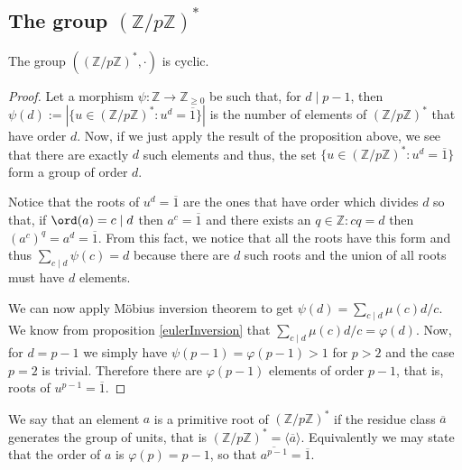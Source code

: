 \subsection{The group \texorpdfstring{\((\mathbb{Z}/p\mathbb{Z})^\ast\)}{(Z/pZ)*}}

\begin{theorem}\label{unitCyclic}
    The group \(((\mathbb{Z}/p\mathbb{Z})^\ast, \cdot)\) is cyclic.
\end{theorem}

\begin{proof}
    Let a morphism \(\psi : \mathbb{Z} \to \mathbb{Z}_{\geqslant 0}\) be such
    that, for \(d \mid p-1\), then \(\psi(d) := |\{u \in
    (\mathbb{Z}/p\mathbb{Z})^\ast : u^d = \overline{1}\}|\) is the number of
    elements of \((\mathbb{Z}/p\mathbb{Z})^\ast\) that have order \(d\). Now, if
    we just apply the result of the proposition above, we see that there are
    exactly \(d\) such elements and thus, the set \(\{u \in
    (\mathbb{Z}/p\mathbb{Z})^\ast : u^d = \overline{1}\}\) form a group of order
    \(d\).

    Notice that the roots of \(u^d = \overline{1}\) are the ones that have
    order which divides \(d\) so that, if \(\ord(a) = c \mid d\) then  \(a^c =
    \overline{1}\) and there exists an \(q \in \mathbb{Z} : cq = d\) then
    \((a^c)^q = a^d = \overline{1}\). From this fact, we notice that all the
    roots have this form and thus \(\sum_{c \mid d} \psi(c) = d\) because there
    are \(d\) such roots and the union of all roots must have \(d\) elements.

    We can now apply Möbius inversion theorem to get \(\psi(d) = \sum_{c \mid d}
    \mu(c) d/c\). We know from proposition \ref{eulerInversion} that \(\sum_{c
        \mid d} \mu(c)d/c = \varphi(d)\). Now, for \(d = p-1\) we simply have
    \(\psi(p-1) = \varphi(p-1) > 1\) for \(p > 2\) and the case \(p=2\) is
    trivial. Therefore there are \(\varphi(p-1)\) elements of order \(p-1\), that
    is, roots of \(u^{p-1} = \overline{1}\).
\end{proof}

\begin{definition}
    We say that an element \(a\) is a primitive root of
    \((\mathbb{Z}/p\mathbb{Z})^\ast\) if the residue class \(\overline{a}\)
    generates the group of units, that is \((\mathbb{Z}/p\mathbb{Z})^\ast =
    \langle \overline{a} \rangle\). Equivalently we may state that the order of
    \(a\) is \(\varphi(p) = p-1\), so that \(\overline{a^{p-1}} = \overline{1}\).
\end{definition}

